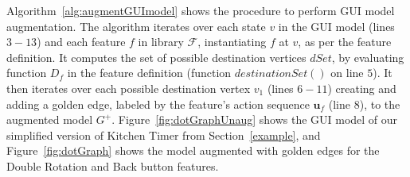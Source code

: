 Algorithm~\ref{alg:augmentGUImodel} shows the procedure to perform GUI model augmentation. The algorithm iterates over each state $v$ in the GUI model (lines $3-13$) and each feature $f$ in library $\mathcal{F}$, instantiating $f$ at $v$, as per the feature definition. It computes the set of possible destination vertices $dSet$, by evaluating function $D_f$ in the feature definition (function $\mathit{destinationSet()}$ on line $5$). It then iterates over each possible destination vertex $v_1$ (lines $6-11$) creating and adding a golden edge, labeled by the feature's action sequence $\mathbf{u}_f$ (line $8$), to the augmented model $G^+$.
Figure~\ref{fig:dotGraphUnaug} shows the GUI model of our simplified version of Kitchen Timer from Section~\ref{example}, and Figure~\ref{fig:dotGraph} shows the model augmented with golden edges for the Double Rotation and Back button features.

